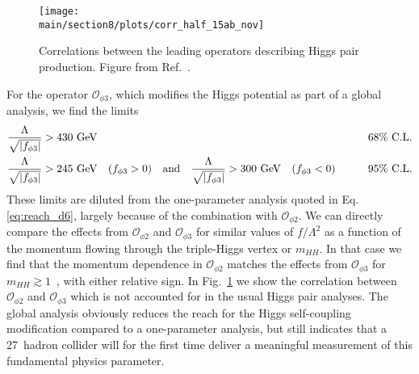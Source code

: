 \begin{figure}[t!]
\centering
\texttt{[image: \\main/section8/plots/corr\_half\_15ab\_nov]}
\caption{Correlations between the leading operators describing Higgs
  pair production. Figure from Ref.~\cite{Biekotter:2018jzu}.}
\label{fig:corr}
\end{figure}
For the operator $\mathcal{O}_{\phi 3}$, which modifies the Higgs potential
as part of a global analysis, we find the limits
%
\begin{alignat}{9}
\frac{\Lambda}{\sqrt{|f_{\phi 3}|}} &> 430~\text{\ensuremath{\text{GeV}}}
&\qquad \text{68\% C.L.} \notag \\
\frac{\Lambda}{\sqrt{|f_{\phi 3}|}} &> 245~\text{\ensuremath{\text{GeV}}}
\quad (f_{\phi 3} >0)
\quad \text{and} \quad 
\frac{\Lambda}{\sqrt{|f_{\phi 3}|}} > 300~\text{\ensuremath{\text{GeV}}}
\quad (f_{\phi 3} <0) 
&\qquad \text{95\% C.L.} 
\label{eq:reach_d6_3}
\end{alignat}
%
These limits are diluted from the one-parameter analysis quoted in
Eq.\eqref{eq:reach_d6}, largely because of the combination with
$\mathcal{O}_{\phi 2}$. We can directly compare the
effects from $\mathcal{O}_{\phi 2}$ and $\mathcal{O}_{\phi 3}$ for similar values of
$f/\Lambda^2$ as a function of the momentum flowing through the
triple-Higgs vertex or $m_{HH}$. In that case we find that the
momentum dependence in $\mathcal{O}_{\phi 2}$ matches the effects from
$\mathcal{O}_{\phi 3}$ for $m_{HH} \gtrsim 1$~\UTeV, with either relative
sign. 
In Fig.~\ref{fig:corr} we show 
the correlation between $\mathcal{O}_{\phi 2}$ and $\mathcal{O}_{\phi 3}$
which is not
accounted for in the usual Higgs pair analyses.
The global analysis obviously
reduces the reach for the Higgs self-coupling modification compared to
a one-parameter analysis, but still indicates that a 27~\UTeV hadron
collider will for the first time deliver a meaningful measurement of
this fundamental physics parameter. 

